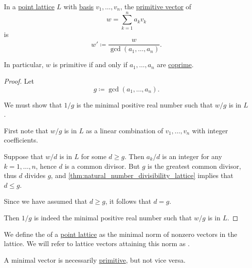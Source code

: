 \begin{proposition}\label{thm:primitive_lattice_vector_via_basis}
  In a \hyperref[def:point_lattice]{point lattice} \( L \) with \hyperref[def:point_lattice_basis]{basis} \( v_1, \ldots, v_n \), the \hyperref[def:primitive_lattice_vector]{primitive vector} of
  \begin{equation*}
    w = \sum_{k=1}^n a_k v_k
  \end{equation*}
  is
  \begin{equation}\label{eq:thm:primitive_lattice_vector_via_basis}
    w' \coloneqq \frac w {\gcd(a_1, \ldots, a_n)}.
  \end{equation}
\end{proposition}
\begin{comments}
  \item In particular, \( w \) is primitive if and only if \( a_1, \ldots, a_n \) are \hyperref[def:coprime_elements]{coprime}.
\end{comments}
\begin{proof}
  Let
  \begin{equation*}
    g \coloneqq \gcd(a_1, \ldots, a_n).
  \end{equation*}

  We must show that \( 1 / g \) is the minimal positive real number such that \( w / g \) is in \( L \).

  First note that \( w / g \) is in \( L \) as a linear combination of \( v_1, \ldots, v_n \) with integer coefficients.

  Suppose that \( w / d \) is in \( L \) for some \( d \geq g \). Then \( a_k / d \) is an integer for any \( k = 1, \ldots, n \), hence \( d \) is a common divisor. But \( g \) is the greatest common divisor, thus \( d \) divides \( g \), and \cref{thm:natural_number_divisibility_lattice} implies that \( d \leq g \).

  Since we have assumed that \( d \geq g \), it follows that \( d = g \).

  Then \( 1 / g \) is indeed the minimal positive real number such that \( w / g \) is in \( L \).
\end{proof}

\begin{definition}\label{def:minimal_lattice_vector}
  We define the  of a \hyperref[def:point_lattice]{point lattice} as the minimal norm of nonzero vectors in the lattice. We will refer to lattice vectors attaining this norm as .
\end{definition}
\begin{comments}
  \item A minimal vector is necessarily \hyperref[def:primitive_lattice_vector]{primitive}, but not vice versa.
\end{comments}

